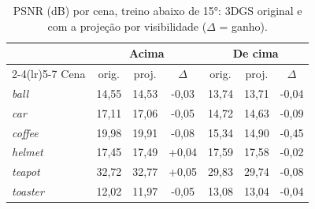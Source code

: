 \begin{table}[t]
\centering
\caption{PSNR (dB) por cena, treino abaixo de 15°: 3DGS original e com a projeção por visibilidade ($\Delta$ = ganho).}
\label{tab:cenas15}
\setlength{\tabcolsep}{4pt}
\begin{tabular}{l ccc ccc}
\toprule
 & \multicolumn{3}{c}{Acima} & \multicolumn{3}{c}{De cima} \\
\cmidrule(lr){2-4}\cmidrule(lr){5-7}
Cena & orig. & proj. & $\Delta$ & orig. & proj. & $\Delta$ \\
\midrule
\textit{ball} & 14{,}55 & 14{,}53 & -0{,}03 & 13{,}74 & 13{,}71 & -0{,}04 \\
\textit{car} & 17{,}11 & 17{,}06 & -0{,}05 & 14{,}72 & 14{,}63 & -0{,}09 \\
\textit{coffee} & 19{,}98 & 19{,}91 & -0{,}08 & 15{,}34 & 14{,}90 & -0{,}45 \\
\textit{helmet} & 17{,}45 & 17{,}49 & +0{,}04 & 17{,}59 & 17{,}58 & -0{,}02 \\
\textit{teapot} & 32{,}72 & 32{,}77 & +0{,}05 & 29{,}83 & 29{,}74 & -0{,}08 \\
\textit{toaster} & 12{,}02 & 11{,}97 & -0{,}05 & 13{,}08 & 13{,}04 & -0{,}04 \\
\bottomrule
\end{tabular}
\end{table}

